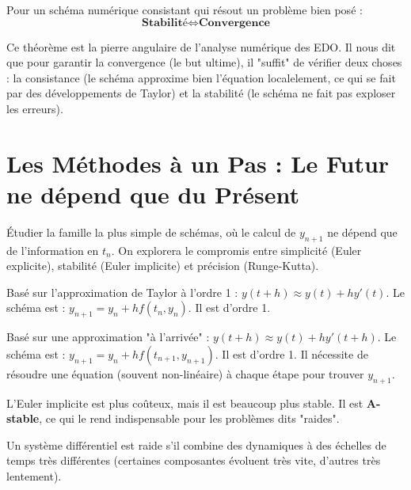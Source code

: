 \begin{theorem}
    Pour un schéma numérique consistant qui résout un problème bien posé :
    $$ \textbf{Stabilité} \iff \textbf{Convergence} $$
\end{theorem}
\begin{remark}
    Ce théorème est la pierre angulaire de l'analyse numérique des EDO. Il nous dit que pour garantir la convergence (le but ultime), il "suffit" de vérifier deux choses : la consistance (le schéma approxime bien l'équation localelement, ce qui se fait par des développements de Taylor) et la stabilité (le schéma ne fait pas exploser les erreurs).
\end{remark}

\section{Les Méthodes à un Pas : Le Futur ne dépend que du Présent}

\begin{objectif}
    Étudier la famille la plus simple de schémas, où le calcul de $y_{n+1}$ ne dépend que de l'information en $t_n$. On explorera le compromis entre simplicité (Euler explicite), stabilité (Euler implicite) et précision (Runge-Kutta).
\end{objectif}

\begin{definition}
    Basé sur l'approximation de Taylor à l'ordre 1 : $y(t+h) \approx y(t) + h y'(t)$.
    Le schéma est : $y_{n+1} = y_n + h f(t_n, y_n)$.
    Il est d'ordre 1.
\end{definition}

\begin{definition}
    Basé sur une approximation "à l'arrivée" : $y(t+h) \approx y(t) + h y'(t+h)$.
    Le schéma est : $y_{n+1} = y_n + h f(t_{n+1}, y_{n+1})$.
    Il est d'ordre 1. Il nécessite de résoudre une équation (souvent non-linéaire) à chaque étape pour trouver $y_{n+1}$.
\end{definition}

\begin{remark}
    L'Euler implicite est plus coûteux, mais il est beaucoup plus stable. Il est \textbf{A-stable}, ce qui le rend indispensable pour les problèmes dits "raides".
\end{remark}

\begin{definition}
    Un système différentiel est raide s'il combine des dynamiques à des échelles de temps très différentes (certaines composantes évoluent très vite, d'autres très lentement).
\end{definition}


